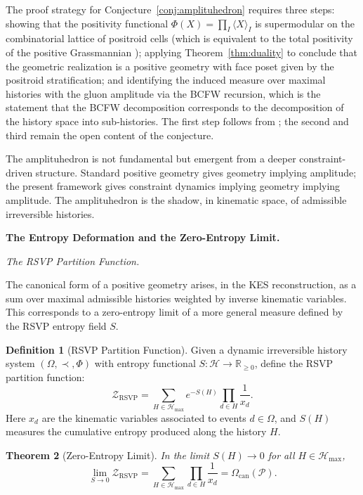 \documentclass[12pt, oneside]{amsart}
\theoremstyle{plain}
\newtheorem{theorem}{Theorem}[section]
\theoremstyle{definition}
\newtheorem{definition}[theorem]{Definition}
\theoremstyle{remark}
\newcommand{\R}{\mathbb{R}}
\newcommand{\Phif}{\Phi}
\newcommand{\Sf}{S}
\newcommand{\OmKS}{\Omega}
\newcommand{\CF}{\Omega_{\mathrm{can}}}
\newcommand{\ZRSVP}{\mathcal{Z}_{\mathrm{RSVP}}}
\newcommand{\Hmax}{\mathcal{H}_{\max}}
\begin{document}
The proof strategy for Conjecture~\ref{conj:amplituhedron} requires three steps: showing that the positivity functional $\Phif(X) = \prod_I \langle X \rangle_I$ is supermodular on the combinatorial lattice of positroid cells (which is equivalent to the total positivity of the positive Grassmannian \cite{Postnikov2006}); applying Theorem~\ref{thm:duality} to conclude that the geometric realization is a positive geometry with face poset given by the positroid stratification; and identifying the induced measure over maximal histories with the gluon amplitude via the BCFW recursion, which is the statement that the BCFW decomposition corresponds to the decomposition of the history space into sub-histories. The first step follows from \cite{Postnikov2006}; the second and third remain the open content of the conjecture.

The amplituhedron is not fundamental but emergent from a deeper constraint-driven structure. Standard positive geometry gives geometry implying amplitude; the present framework gives constraint dynamics implying geometry implying amplitude. The amplituhedron is the shadow, in kinematic space, of admissible irreversible histories.

\bigskip\noindent\textbf{The Entropy Deformation and the Zero-Entropy Limit.}
\label{sec:entropy}

\medskip\noindent\textit{The RSVP Partition Function.}

The canonical form of a positive geometry arises, in the KES reconstruction, as a sum over maximal admissible histories weighted by inverse kinematic variables. This corresponds to a zero-entropy limit of a more general measure defined by the RSVP entropy field $\Sf$.

\begin{definition}[RSVP Partition Function]
Given a dynamic irreversible history system $(\OmKS, \prec, \Phif)$ with entropy functional $\Sf: \mathcal{H} \to \R_{\geq 0}$, define the RSVP partition function:
\begin{equation}
\label{eq:rsvp-partition}
  \ZRSVP = \sum_{H \in \Hmax} e^{-\Sf(H)} \prod_{d \in H} \frac{1}{x_d}.
\end{equation}
Here $x_d$ are the kinematic variables associated to events $d \in \OmKS$, and $\Sf(H)$ measures the cumulative entropy produced along the history $H$.
\end{definition}

\begin{theorem}[Zero-Entropy Limit]
\label{thm:zero-entropy}
In the limit $\Sf(H) \to 0$ for all $H \in \Hmax$,
\[
  \lim_{\Sf \to 0} \ZRSVP = \sum_{H \in \Hmax} \prod_{d \in H} \frac{1}{x_d} = \CF(\mathcal{P}).
\]
\end{theorem}
\end{document}

